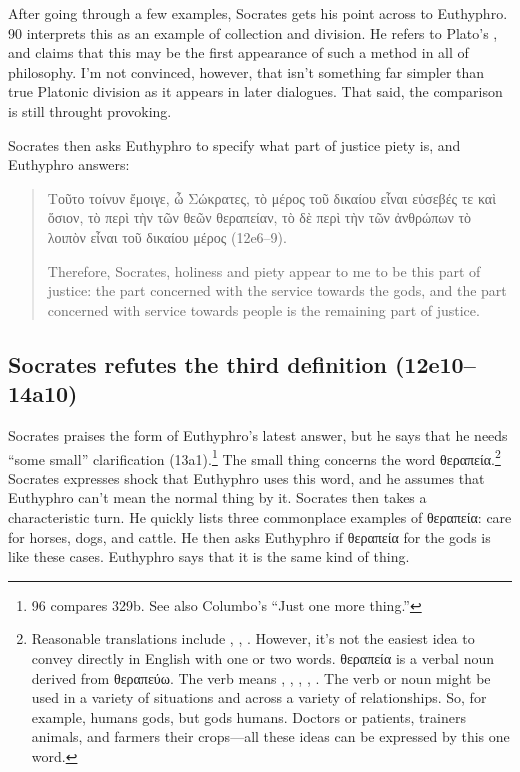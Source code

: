 \documentclass[11pt]{article}
\begin{document}
After going through a few examples, Socrates gets his point across to Euthyphro.  \citet{bailly2003} 90 interprets this as an example of collection and division.  He refers to Plato's , and claims that this may be the first appearance of such a method in all of philosophy.  I'm not convinced, however, that isn't something far simpler than true Platonic division as it appears in later dialogues.  That said, the comparison is still throught provoking.

Socrates then asks Euthyphro to specify what part of justice piety is, and
Euthyphro answers:

\begin{quote}

    {\g
    Τοῦτο τοίνυν ἔμοιγε, ὦ Σώκρατες, τὸ μέρος τοῦ δικαίου εἶναι εὐσεβές τε καὶ ὅσιον, τὸ περὶ τὴν τῶν θεῶν θεραπείαν, τὸ δὲ περὶ τὴν τῶν ἀνθρώπων τὸ λοιπὸν εἶναι τοῦ δικαίου μέρος
    } (12e6--9).

    Therefore, Socrates, holiness and piety appear to me to be this part of justice: the part concerned with the service towards the gods, and the part concerned with service towards people is the remaining part of justice.

\end{quote}


\subsection{Socrates refutes the third definition (12e10--14a10)}

Socrates praises the form of Euthyphro's latest answer, but he says that he needs ``some small'' clarification (13a1).\footnote{\citet{bailly2003} 96 compares  329b.  See also Columbo's ``Just one more thing.''} The small thing concerns the word {\g θεραπεία}.\footnote{ Reasonable translations include , , .  However, it's not the easiest idea to convey directly in English with one or two words.  {\g θεραπεία} is a verbal noun derived from {\g θεραπεύω}.  The verb means , , , , .  The verb or noun might be used in a variety of situations and across a variety of relationships.  So, for example, humans  gods, but gods  humans.  Doctors  or  patients, trainers  animals, and farmers  their crops---all these ideas can be expressed by this one word.}  Socrates expresses shock that Euthyphro uses this word, and he assumes that Euthyphro can't mean the normal thing by it.  Socrates then takes a characteristic turn.  He quickly lists three commonplace examples of {\g θεραπεία}: care for horses, dogs, and cattle.  He then asks Euthyphro if θεραπεία for the gods is like these cases.  Euthyphro says that it is the same kind of thing.
\end{document}
